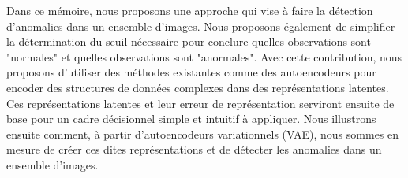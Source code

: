 Dans ce mémoire, nous proposons une approche qui vise à faire la détection d'anomalies dans un ensemble d'images. Nous proposons également de simplifier la détermination du seuil nécessaire pour conclure quelles observations sont "normales" et quelles observations sont "anormales". Avec cette contribution, nous proposons d'utiliser des méthodes existantes comme des autoencodeurs  pour encoder des structures de données complexes dans des représentations latentes. Ces représentations latentes et leur erreur de représentation serviront ensuite de base pour un cadre décisionnel simple et intuitif à appliquer. Nous illustrons ensuite comment, à partir d'autoencodeurs variationnels (VAE), nous sommes en mesure de créer ces dites représentations et de détecter les anomalies dans un ensemble d'images.